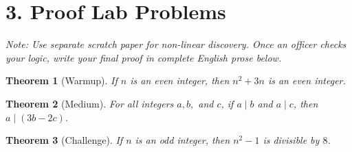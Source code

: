 \documentclass[11pt]{article}
\theoremstyle{definition}
\theoremstyle{plain}
\newtheorem{theorem}{Theorem}
\theoremstyle{remark}
\begin{document}
\section*{3. Proof Lab Problems}
\textit{Note: Use separate scratch paper for non-linear discovery. Once an officer checks your logic, write your final proof in complete English prose below.}

\vspace{1em}

\begin{theorem}[Warmup]
    If \(n\) is an even integer, then \(n^2 + 3n\) is an even integer.
\end{theorem}

\begin{tcolorbox}[colback=white, colframe=black!75, title=Formal Proof (Complete English Sentences)]
\vspace{6.0cm}
\end{tcolorbox}

\newpage

\begin{theorem}[Medium]
    For all integers \(a, b,\) and \(c\), if \(a \mid b\) and \(a \mid c\), then \(a \mid (3b - 2c)\).
\end{theorem}

\begin{tcolorbox}[colback=white, colframe=black!75, title=Formal Proof (Complete English Sentences)]
\vspace{7.0cm}
\end{tcolorbox}

\vspace{1.5em}

\begin{theorem}[Challenge]
    If \(n\) is an odd integer, then \(n^2 - 1\) is divisible by \(8\).
\end{theorem}

\begin{tcolorbox}[colback=white, colframe=black!75, title=Formal Proof (Complete English Sentences)]
\vspace{7.0cm}
\end{tcolorbox}
\end{document}
